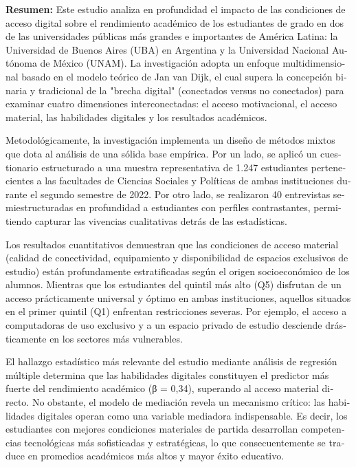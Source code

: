 \documentclass{article}
\begin{document}
\begin{tcolorbox}[colback=brown!8!white,colframe=brown!8!white,boxrule=0pt,arc=2pt,left=4pt,right=4pt,top=3pt,bottom=3pt,before skip=4pt,after skip=4pt]
\begin{otherlanguage}{spanish}
\sffamily\small \textbf{Resumen:} Este estudio analiza en profundidad el impacto de las condiciones de acceso digital sobre el rendimiento académico de los estudiantes de grado en dos de las universidades públicas más grandes e importantes de América Latina: la Universidad de Buenos Aires (UBA) en Argentina y la Universidad Nacional Autónoma de México (UNAM). La investigación adopta un enfoque multidimensional basado en el modelo teórico de Jan van Dijk, el cual supera la concepción binaria y tradicional de la "brecha digital" (conectados versus no conectados) para examinar cuatro dimensiones interconectadas: el acceso motivacional, el acceso material, las habilidades digitales y los resultados académicos.

Metodológicamente, la investigación implementa un diseño de métodos mixtos que dota al análisis de una sólida base empírica. Por un lado, se aplicó un cuestionario estructurado a una muestra representativa de 1.247 estudiantes pertenecientes a las facultades de Ciencias Sociales y Políticas de ambas instituciones durante el segundo semestre de 2022. Por otro lado, se realizaron 40 entrevistas semiestructuradas en profundidad a estudiantes con perfiles contrastantes, permitiendo capturar las vivencias cualitativas detrás de las estadísticas.

Los resultados cuantitativos demuestran que las condiciones de acceso material (calidad de conectividad, equipamiento y disponibilidad de espacios exclusivos de estudio) están profundamente estratificadas según el origen socioeconómico de los alumnos. Mientras que los estudiantes del quintil más alto (Q5) disfrutan de un acceso prácticamente universal y óptimo en ambas instituciones, aquellos situados en el primer quintil (Q1) enfrentan restricciones severas. Por ejemplo, el acceso a computadoras de uso exclusivo y a un espacio privado de estudio desciende drásticamente en los sectores más vulnerables.

El hallazgo estadístico más relevante del estudio mediante análisis de regresión múltiple determina que las habilidades digitales constituyen el predictor más fuerte del rendimiento académico (β = 0,34), superando al acceso material directo. No obstante, el modelo de mediación revela un mecanismo crítico: las habilidades digitales operan como una variable mediadora indispensable. Es decir, los estudiantes con mejores condiciones materiales de partida desarrollan competencias tecnológicas más sofisticadas y estratégicas, lo que consecuentemente se traduce en promedios académicos más altos y mayor éxito educativo.


\end{otherlanguage}
\end{tcolorbox}
\end{document}
